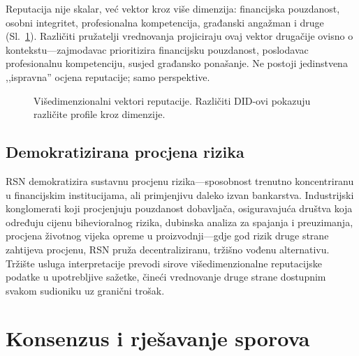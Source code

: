 \documentclass[11pt,a4paper,twocolumn]{article}
\begin{document}
Reputacija nije skalar, već vektor kroz više dimenzija: financijska pouzdanost, osobni integritet, profesionalna kompetencija, građanski angažman i druge (Sl.~\ref{fig:reputation-radar}). Različiti pružatelji vrednovanja projiciraju ovaj vektor drugačije ovisno o kontekstu---zajmodavac prioritizira financijsku pouzdanost, poslodavac profesionalnu kompetenciju, susjed građansko ponašanje. Ne postoji jedinstvena ,,ispravna'' ocjena reputacije; samo perspektive.

\begin{figure}[ht]
\centering
{}
\caption{Višedimenzionalni vektori reputacije. Različiti DID-ovi pokazuju različite profile kroz dimenzije.}
\label{fig:reputation-radar}
\end{figure}

\subsection{Demokratizirana procjena rizika}

RSN demokratizira sustavnu procjenu rizika---sposobnost trenutno koncentriranu u financijskim institucijama, ali primjenjivu daleko izvan bankarstva. Industrijski konglomerati koji procjenjuju pouzdanost dobavljača, osiguravajuća društva koja određuju cijenu bihevioralnog rizika, dubinska analiza za spajanja i preuzimanja, procjena životnog vijeka opreme u proizvodnji---gdje god rizik druge strane zahtijeva procjenu, RSN pruža decentraliziranu, tržišno vođenu alternativu. Tržište usluga interpretacije prevodi sirove višedimenzionalne reputacijske podatke u upotrebljive sažetke, čineći vrednovanje druge strane dostupnim svakom sudioniku uz granični trošak.

\section{Konsenzus i rješavanje sporova}
\end{document}
